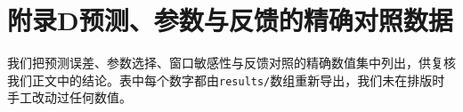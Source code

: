 \documentclass[UTF8,fontset=none,a4paper,zihao=-4]{ctexart}
\begin{document}
\section*{附录D\quad 预测、参数与反馈的精确对照数据}
我们把预测误差、参数选择、窗口敏感性与反馈对照的精确数值集中列出，供复核我们正文中的结论。表中每个数字都由\texttt{results/}数组重新导出，我们未在排版时手工改动过任何数值。










\end{document}
